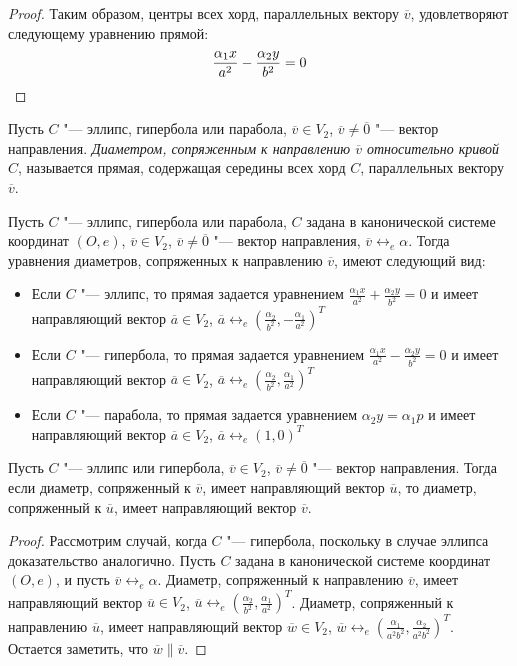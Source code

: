 {\begin{proof}
	Таким образом, центры всех хорд, параллельных вектору $\overline{v}$, удовлетворяют следующему уравнению прямой:
	\[\frac{\alpha_1 x}{a^2} - \frac{\alpha_2 y}{b^2} = 0\qedhere\]
\end{proof}

\begin{definition}
	Пусть $C$ "--- эллипс, гипербола или парабола, $\overline{v} \in V_2$, $\overline{v} \ne \overline 0$ "--- вектор направления. \textit{Диаметром, сопряженным к направлению $\overline{v}$ относительно кривой $C$}, называется прямая, содержащая середины всех хорд $C$, параллельных вектору $\overline{v}$.
\end{definition}

\begin{note}
	Пусть $C$ "--- эллипс, гипербола или парабола, $C$ задана в канонической системе координат $(O, e)$, $\overline{v} \in V_2$, $\overline{v} \ne \overline 0$ "--- вектор направления, $\overline{v} \leftrightarrow_{e} \alpha$. Тогда уравнения диаметров, сопряженных к направлению $\overline{v}$, имеют следующий вид:
	\begin{itemize}
		\item Если $C$ "--- эллипс, то прямая задается уравнением $\frac{\alpha_1 x}{a^2} + \frac{\alpha_2 y}{b^2} = 0$ и имеет направляющий вектор $\overline a \in V_2$, $\overline{a} \leftrightarrow_{e} (\frac{\alpha_2}{b^2}, -\frac{\alpha_1}{a^2})^T$
		\item Если $C$ "--- гипербола, то прямая задается уравнением $\frac{\alpha_1 x}{a^2} - \frac{\alpha_2 y}{b^2} = 0$ и имеет направляющий вектор $\overline a \in V_2$, $\overline{a} \leftrightarrow_{e} (\frac{\alpha_2}{b^2}, \frac{\alpha_1}{a^2})^T$
		\item Если $C$ "--- парабола, то прямая задается уравнением $\alpha_2 y = \alpha_1 p$ и имеет направляющий вектор $\overline a \in V_2$, $\overline{a} \leftrightarrow_{e} (1, 0)^T$
	\end{itemize}
\end{note}

\begin{proposition}
	Пусть $C$ "--- эллипс или гипербола, $\overline{v} \in V_2$, $\overline{v} \ne \overline 0$ "--- вектор направления. Тогда если диаметр, сопряженный к $\overline{v}$, имеет направляющий вектор $\overline{u}$, то диаметр, сопряженный к $\overline{u}$, имеет направляющий вектор $\overline{v}$.
\end{proposition}

\begin{proof}
	Рассмотрим случай, когда $C$ "--- гипербола, поскольку в случае эллипса доказательство аналогично. Пусть $C$ задана в канонической системе координат $(O, e)$, и пусть $\overline{v} \leftrightarrow_{e} \alpha$. Диаметр, сопряженный к направлению $\overline{v}$, имеет направляющий вектор $\overline{u} \in V_2$, $\overline u \leftrightarrow_{e} (\frac{\alpha_2}{b^2}, \frac{\alpha_1}{a^2})^T$. Диаметр, сопряженный к направлению $\overline{u}$, имеет направляющий вектор $\overline w \in V_2$, $\overline{w} \leftrightarrow_{e} (\frac{\alpha_1}{a^2b^2}, \frac{\alpha_2}{a^2b^2})^T$. Остается заметить, что $\overline{w} \parallel \overline{v}$.
\end{proof}

}
